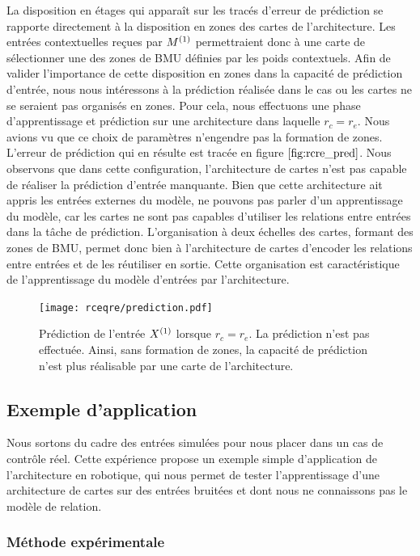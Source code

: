 \documentclass[../main]{subfiles}
\begin{document}
La disposition en étages qui apparaît sur les tracés d'erreur de prédiction se rapporte directement à la disposition en zones des cartes de l'architecture.
Les entrées contextuelles reçues par $M^{({1})}$ permettraient donc à une carte de sélectionner une des zones de BMU définies par les poids contextuels.
Afin de valider l'importance de cette disposition en zones dans la capacité de prédiction d'entrée, nous nous intéressons à la prédiction réalisée dans le cas ou les cartes ne se seraient pas organisés en zones.
Pour cela, nous effectuons une phase d'apprentissage et prédiction sur une architecture dans laquelle $r_c = r_e$. 
Nous avions vu que ce choix de paramètres n'engendre pas la formation de zones. L'erreur de prédiction qui en résulte est tracée en figure $\ref{fig:rcre_pred}$.
Nous observons que dans cette configuration, l'architecture de cartes n'est pas capable de réaliser la prédiction d'entrée manquante.
Bien que cette architecture ait appris les entrées externes du modèle, ne pouvons pas parler d'un apprentissage du modèle, car les cartes ne sont pas capables d'utiliser les relations entre entrées dans la tâche de prédiction.
L'organisation à deux échelles des cartes, formant des zones de BMU, permet donc bien à l'architecture de cartes d'encoder les relations entre entrées et de les réutiliser en sortie. Cette organisation est caractéristique de l'apprentissage du modèle d'entrées par l'architecture.

\begin{figure}
	\centering\texttt{[image: rceqre/prediction.pdf]}
	\caption{Prédiction de l'entrée $X^{({1})}$ lorsque $r_c = r_e$. La prédiction n'est pas effectuée. Ainsi, sans formation de zones, la capacité de prédiction n'est plus réalisable par une carte de l'architecture. \label{fig:rcre_pred}}
\end{figure}

\subsection{Exemple d'application}

Nous sortons du cadre des entrées simulées pour nous placer dans un cas de contrôle réel.
Cette expérience propose un exemple simple d'application de l'architecture en robotique, qui nous permet de tester l'apprentissage d'une architecture de cartes sur des entrées bruitées et dont nous ne connaissons pas le modèle de relation.

\subsubsection{Méthode expérimentale}
\end{document}
